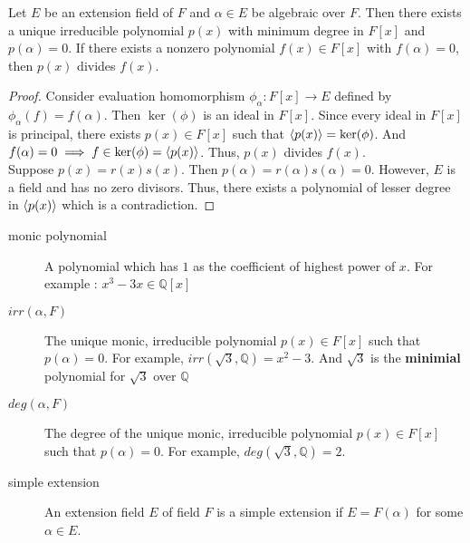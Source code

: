 \begin{theorem}
	Let $E$ be an extension field of $F$ and $\alpha \in E$ be algebraic over $F$.
	Then there exists a unique irreducible polynomial $p(x)$ with minimum degree in $F[x]$ and $p(\alpha) = 0$.
	If there exists a nonzero polynomial $f(x) \in F[x]$ with $f(\alpha) = 0$, then $p(x)$ divides $f(x)$.
\end{theorem}
\begin{proof}
	Consider evaluation homomorphism $\phi_\alpha : F[x] \to E$ defined by $\phi_\alpha(f) = f(\alpha)$.
	Then $\ker(\phi)$ is an ideal in $F[x]$.
	Since every ideal in $F[x]$ is principal, there exists $p(x) \in F[x]$ such that $\left\langle p(x)\right\rangle = \ker(\phi)$.
	And $f(\alpha) = 0 \implies f \in \ker(\phi) = \left\langle p(x)\right\rangle$.
	Thus, $p(x)$ divides $f(x)$.\\

	Suppose $p(x) = r(x)s(x)$.
	Then $p(\alpha) = r(\alpha)s(\alpha) = 0$.
	However, $E$ is a field and has no zero divisors.
	Thus, there exists a polynomial of lesser degree in $\left\langle p(x)\right\rangle$ which is a contradiction.
\end{proof}

\begin{description}
	\item[monic polynomial] A polynomial which has $1$ as the coefficient of highest power of $x$.
		For example : $x^3 - 3x \in \mathbb{Q}[x]$
	\item[$irr(\alpha,F)$] The unique monic, irreducible polynomial $p(x) \in F[x]$ such that $p(\alpha) = 0$.
		For example, $irr(\sqrt{3},\mathbb{Q}) = x^2-3$.
		And $\sqrt{3}$ is the \textbf{minimial} polynomial for $\sqrt{3}$ over $\mathbb{Q}$
	\item[$deg(\alpha,F)$] The degree of the unique monic, irreducible polynomial $p(x) \in F[x]$ such that $p(\alpha) = 0$.
		For example, $deg(\sqrt{3},\mathbb{Q}) = 2$.
	\item[simple extension] An extension field $E$ of field $F$ is a simple extension if $E = F(\alpha)$ for some $\alpha \in E$.
\end{description}

